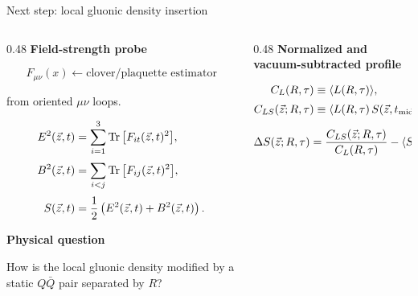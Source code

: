 \documentclass[11pt,rgb,ratio=169]{beamer}
\begin{document}
\begin{frame}{Next step: local gluonic density insertion}
\footnotesize
\begin{columns}[T,totalwidth=\textwidth]

\begin{column}{0.48\textwidth}
\textbf{Field-strength probe}\vspace{0.01em}

{\scriptsize
\[
F_{\mu\nu}(x)\leftarrow \text{clover/plaquette estimator}
\]
\vspace{-0.9em}

\centering
from oriented $\mu\nu$ loops.
}

\vspace{0.35em}
{\scriptsize
\[
\begin{aligned}
E^2(\vec z,t)
&=
\sum_{i=1}^{3}
{\rm Tr}\,\big[F_{i t}(\vec z,t)^2\big],\\[0.25em]
B^2(\vec z,t)
&=
\sum_{i<j}
{\rm Tr}\,\big[F_{ij}(\vec z,t)^2\big],\\[0.25em]
S(\vec z,t)
&=
\frac12\left(E^2(\vec z,t)+B^2(\vec z,t)\right).
\end{aligned}
\]
}

\vspace{0.55em}
\textbf{Physical question}\vspace{0.25em}

{\scriptsize
How is the local gluonic density modified by a static
$Q\bar Q$ pair separated by $R$?
}

\end{column}

\begin{column}{0.48\textwidth}
\textbf{Normalized and vacuum-subtracted profile}\vspace{0.01em}

{\scriptsize
\[
\begin{aligned}
C_L(R,\tau)
&\equiv
\langle L(R,\tau)\rangle,\\[0.25em]
C_{LS}(\vec z;R,\tau)
&\equiv
\left\langle
L(R,\tau)\,
S(\vec z,t_{\rm mid})
\right\rangle .
\end{aligned}
\]
}

\vspace{0.15em}
{\scriptsize
\[
\Delta S(\vec z;R,\tau)
=
\frac{C_{LS}(\vec z;R,\tau)}
     {C_L(R,\tau)}
-
\left\langle S(\vec z,t_{\rm mid})\right\rangle .
\]
}


\end{column}
\end{columns}
\end{frame}
\end{document}
